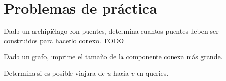 \section{Problemas de práctica}

\begin{exercise}
	Dado un archipiélago con puentes, determina cuantos puentes deben ser construidos para hacerlo conexo. TODO
\end{exercise}

\begin{exercise}
	Dado un grafo, imprime el tamaño de la componente conexa más grande.
\end{exercise}

\begin{exercise}
	Determina si es posible viajara de \(u\) hacia \(v\) en queries.
\end{exercise}

\begin{exercise}
\end{exercise}

\begin{exercise}
\end{exercise}

\begin{exercise}
\end{exercise}

